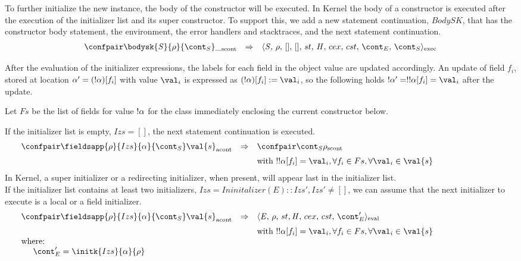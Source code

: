 \documentclass{article}
\begin{document}
\noindent
To further initialize the new instance, the body of the constructor will be executed. In Kernel the body of a constructor is executed after the execution of the initializer list and its super constructor.
\noindent
To support this, we add a new statement continuation, $BodySK$, that has the constructor body statement, the environment, the error handlers and stacktraces, and the next statement continuation.
\[
  \begin{array}{lcl}
	\scontconf{\bodysk{\stmt}{\env}{\scont}}{\_}
	& \Rightarrow &
	\execconf{\stmt}{\env}{[]}{[]}{\handler}{\cex}{\cstrace}{\econt}{\scont}
  \end{array}
\]

\noindent
After the evaluation of the initializer expressions, the labels for each field in the object value are updated accordingly. An update of field $f_i$, stored at location $\alpha' = (!\alpha)[f_i]$ with value $\val_i$ is expressed as $\update{(\deref{\loc})[f_i]}{\val_{i}}$, so the following holds $\deref{\loc'} = \deref{\deref{\loc[f_i]}} = \val_{i}$ after the update.

\noindent
Let $Fs$ be the list of fields for value $!\alpha$ for the class immediately enclosing the current constructor below.

If the initializer list is empty, $Izs = []$, the next statement continuation is executed.
\[
  \begin{array}{lcl@{\hspace{30mm}}}
	\acontconf{\fieldsapp{\env}{Izs}{\loc}{\scont}}{\val{s}}
	& \Rightarrow &
	\scontconf{\scont}{\env}\\[2mm]
	&&\textrm{with }\deref{\deref\loc[f_i]} = \val_{i}, \forall f_i \in Fs, \forall \val_i \in \val{s}
  \end{array}
\]
\noindent
In Kernel, a super initializer or a redirecting initializer, when present, will appear last in the initializer list.\\
If the initializer list contains at least two initializers, $Izs = Ininitalizer(E) :: Izs', Izs' \neq []$, we can assume that the next initializer to execute is a local or a field initializer.
\[
  \begin{array}{lcl@{\hspace{30mm}}}
	\acontconf{\fieldsapp{\env}{Izs}{\loc}{\scont}}{\val{s}}
	& \Rightarrow &
	\evalconf{\expr}{\env}{st}{cex}{cst}{\econt'}\\[2mm]
	&&\textrm{with }\deref{\deref{\loc[f_i]}} = \val_{i}, \forall f_i \in Fs, \forall \val_i \in \val{s}\\
	\textrm{where:}\\
	\hspace{5mm}\econt' = \initk{Izs}{\loc}{\env}
  \end{array}
\]
\end{document}
